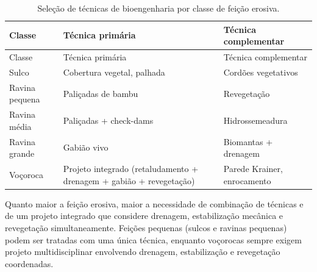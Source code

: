\documentclass[
  portuguese,
  11pt,
  a4paper,
  open=any]{scrbook}
\begin{document}
\begin{longtable}[]{@{}
  >{\raggedright\arraybackslash}p{}
  >{\raggedright\arraybackslash}p{}
  >{\raggedright\arraybackslash}p{}@{}}
\caption{Seleção de técnicas de bioengenharia por classe de feição
erosiva.}\label{tbl-selecao}\tabularnewline
\toprule\noalign{}
\begin{minipage}[b]{\linewidth}\raggedright
Classe
\end{minipage} & \begin{minipage}[b]{\linewidth}\raggedright
Técnica primária
\end{minipage} & \begin{minipage}[b]{\linewidth}\raggedright
Técnica complementar
\end{minipage} \\
\midrule\noalign{}
\endfirsthead
\toprule\noalign{}
\begin{minipage}[b]{\linewidth}\raggedright
Classe
\end{minipage} & \begin{minipage}[b]{\linewidth}\raggedright
Técnica primária
\end{minipage} & \begin{minipage}[b]{\linewidth}\raggedright
Técnica complementar
\end{minipage} \\
\midrule\noalign{}
\endhead
\bottomrule\noalign{}
\endlastfoot
Sulco & Cobertura vegetal, palhada & Cordões vegetativos \\
Ravina pequena & Paliçadas de bambu & Revegetação \\
Ravina média & Paliçadas + check-dams & Hidrossemeadura \\
Ravina grande & Gabião vivo & Biomantas + drenagem \\
Voçoroca & Projeto integrado (retaludamento + drenagem + gabião +
revegetação) & Parede Krainer, enrocamento \\
\end{longtable}

\begin{tcolorbox}[enhanced jigsaw, leftrule=.75mm, colframe=quarto-callout-tip-color-frame, colback=white, bottomrule=.15mm, opacityback=0, colbacktitle=quarto-callout-tip-color!10!white, breakable, bottomtitle=1mm, opacitybacktitle=0.6, title=\textcolor{quarto-callout-tip-color}{\faLightbulb}\hspace{0.5em}{Regra prática}, titlerule=0mm, toprule=.15mm, toptitle=1mm, rightrule=.15mm, left=2mm, arc=.35mm, coltitle=black]

Quanto maior a feição erosiva, maior a necessidade de combinação de
técnicas e de um projeto integrado que considere drenagem, estabilização
mecânica e revegetação simultaneamente. Feições pequenas (sulcos e
ravinas pequenas) podem ser tratadas com uma única técnica, enquanto
voçorocas sempre exigem projeto multidisciplinar envolvendo drenagem,
estabilização e revegetação coordenadas.

\end{tcolorbox}
\end{document}
